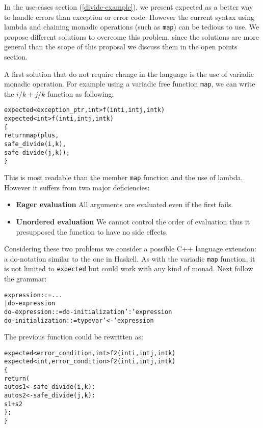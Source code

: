 \documentclass[a4paper,10pt]{article}
\newcommand{\cpp}[1]{\lstinline{#1}}
\newcommand{\suppress}[1]{\colorbox{suppress_color}{#1}}
\newcommand{\update}[1]{\colorbox{update_color}{#1}}
\begin{document}
In the use-cases section (\ref{divide-example}), we present expected as a better way to handle errors than exception or error code. However the current syntax using lambda and chaining monadic operations (such as \cpp{map}) can be tedious to use. We propose different solutions to overcome this problem, since the solutions are more general than the scope of this proposal we discuss them in the open points section.

A first solution that do not require change in the language is the use of variadic monadic operation. For example using a variadic free function \cpp{map}, we can write the $i/k + j/k$ function as following:

\begin{alltt}
\suppress{expected<exception_ptr,int> f(int i, int j, int k)}
\update{expected<int> f(int i, int j, int k)}
\{
  return map(plus,
    safe_divide(i, k), 
    safe_divide(j, k));
\}
\end{alltt}

This is most readable than the member \cpp{map} function and the use of lambda. However it suffers from two major deficiencies:

\begin{itemize}
\item \textbf{Eager evaluation} All arguments are evaluated even if the first fails.
\item \textbf{Unordered evaluation} We cannot control the order of evaluation thus it presupposed the function to have no side effects.
\end{itemize}

Considering these two problems we consider a possible C++ language extension: a do-notation similar to the one in Haskell. As with the variadic \cpp{map} function, it is not limited to \cpp{expected} but could work with any kind of monad. Next follow the grammar:

\begin{alltt}
expression ::= ...
            | do-expression
do-expression ::= do-initialization ':' expression
do-initialization ::= type var '<-' expression
\end{alltt}

\noindent
The previous function could be rewritten as:

\begin{alltt}
\suppress{expected<error_condition, int> f2(int i, int j, int k)}
\update{expected<int, error_condition> f2(int i, int j, int k)}
\{
  return (
    auto s1 <- safe_divide(i, k) :
    auto s2 <- safe_divide(j, k) :
    s1 + s2
  );
\}
\end{alltt}
\end{document}
